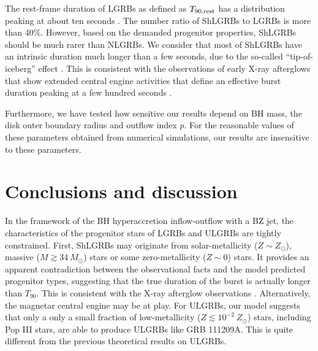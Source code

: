 \documentclass[twocolumn]{aastex6}
\begin{document}
The rest-frame duration of LGRBs as defined as $T_{{90}, \rm rest}$ has a distribution peaking at about ten seconds \citep[e.g.,][]{Zhang2013,Zhang2014}. The number ratio of ShLGRBs to LGRBs is more than 40$\%$. However, based on the demanded progenitor properties, ShLGRBs should be much rarer than NLGRBs. We consider that most of ShLGRBs have an intrinsic duration much longer than a few seconds, due to the so-called ``tip-of-iceberg'' effect \citep{Lu2014,Li2016}. This is consistent with the observations of early X-ray afterglows that show extended central engine activities that define an effective burst duration peaking at a few hundred seconds \citep[e.g.,][]{Burrows2005,Liang2006,Zhang2006a,Luo2013,Zhang2014,Mu2016}.

Furthermore, we have tested how sensitive our results depend on BH mass, the disk outer boundary radius and outflow index $p$. For the reasonable values of these parameters obtained from numerical simulations, our results are insensitive to these parameters.

\section{Conclusions and discussion}

In the framework of the BH hyperaccretion inflow-outflow with a BZ jet, the characteristics of the progenitor stars of LGRBs and ULGRBs are tightly constrained. First, ShLGRBs may originate from solar-metallicity ($Z \sim Z_\odot$), massive ($M \gtrsim 34 ~M_\odot$) stars or some zero-metallicity ($Z \sim 0$) stars. It provides an apparent contradiction between the observational facts and the model predicted progenitor types, suggesting that the true duration of the burst is actually longer than $T_{90}$. This is consistent with the X-ray afterglow observations \citep[e.g.,][]{Burrows2005,Liang2006,Zhang2006a,Luo2013,Zhang2014,Mu2016}. Alternatively, the magnetar central engine may be at play. For ULGRBs, our model suggests that only a only a small fraction of low-metallicity ($Z \lesssim 10^{-2}~Z_\odot$) stars, including Pop III stars, are able to produce ULGRBs like GRB 111209A. This is quite different from the previous theoretical results on ULGRBs.
\end{document}
